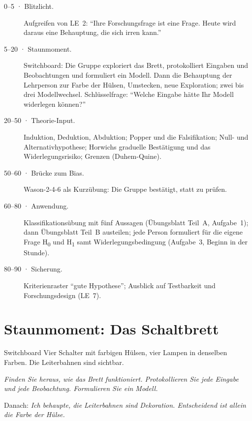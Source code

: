 \begin{ablauf}
\begin{description}
\item[0--5 · Blitzlicht.] Aufgreifen von LE~2: \enquote{Ihre
  Forschungsfrage ist eine Frage. Heute wird daraus eine Behauptung, die
  sich irren kann.}
\item[5--20 · Staunmoment.] Switchboard: Die Gruppe exploriert das Brett,
  protokolliert Eingaben und Beobachtungen und formuliert ein Modell.
  Dann die Behauptung der Lehrperson zur Farbe der Hülsen, Umstecken,
  neue Exploration; zwei bis drei Modellwechsel. Schlüsselfrage:
  \enquote{Welche Eingabe hätte Ihr Modell widerlegen können?}
\item[20--50 · Theorie-Input.] Induktion, Deduktion, Abduktion; Popper und
  die Falsifikation; Null- und Alternativhypothese; Horwichs graduelle
  Bestätigung und das Widerlegungsrisiko; Grenzen (Duhem-Quine).
\item[50--60 · Brücke zum Bias.] Wason-2-4-6 als Kurzübung: Die Gruppe
  bestätigt, statt zu prüfen.
\item[60--80 · Anwendung.] Klassifikationsübung mit fünf Aussagen
  (Übungsblatt Teil~A, Aufgabe~1); dann Übungsblatt Teil~B austeilen;
  jede Person formuliert für die eigene Frage H\textsubscript{0} und
  H\textsubscript{1} samt Widerlegungsbedingung (Aufgabe~3, Beginn in der
  Stunde).
\item[80--90 · Sicherung.] Kriterienraster \enquote{gute Hypothese};
  Ausblick auf Testbarkeit und Forschungsdesign (LE~7).
\end{description}
\end{ablauf}

\section{Staunmoment: Das Schaltbrett}
\begin{staunbox}{Switchboard}
Vier Schalter mit farbigen Hülsen, vier Lampen in denselben Farben.
Die Leiterbahnen sind sichtbar.

\emph{Finden Sie heraus, wie das Brett funktioniert. Protokollieren Sie
jede Eingabe und jede Beobachtung. Formulieren Sie ein Modell.}

\medskip
Danach: \emph{Ich behaupte, die Leiterbahnen sind Dekoration. Entscheidend
ist allein die Farbe der Hülse.}
\end{staunbox}
\os{\newpage}

